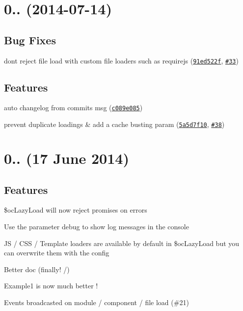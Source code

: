 \label{_0.3.1}%
 \section*{0.. (2014-\/07-\/14)}

\subsection*{Bug Fixes}


\begin{DoxyItemize}
\item don\textquotesingle{}t reject file load with custom file loaders such as requirejs (\href{https://github.com/ocombe/ocLazyLoad/commit/91ed522f724c3d384146053623bbd1e7c2c86751}{\tt 91ed522f}, \href{https://github.com/ocombe/ocLazyLoad/issues/33}{\tt \#33})
\end{DoxyItemize}

\subsection*{Features}


\begin{DoxyItemize}
\item auto changelog from commits msg (\href{https://github.com/ocombe/ocLazyLoad/commit/c089e085431d9f1a968e94c78f3c5ac5af71fa72}{\tt c089e085})
\item prevent duplicate loadings \& add a cache busting param (\href{https://github.com/ocombe/ocLazyLoad/commit/5a5d7f108578fe31c5ca1f7c8dfc2d3bccfd1106}{\tt 5a5d7f10}, \href{https://github.com/ocombe/ocLazyLoad/issues/38}{\tt \#38})
\end{DoxyItemize}

\section*{0.. (17 June 2014)}

\subsection*{Features}


\begin{DoxyItemize}
\item \$oc\+Lazy\+Load will now reject promises on errors
\item Use the parameter {\ttfamily debug} to show log messages in the console
\item JS / C\+SS / Template loaders are available by default in \$oc\+Lazy\+Load but you can overwrite them with the config
\item Better doc (finally! /)
\item Example1 is now much better !
\item Events broadcasted on module / component / file load (\#21)
\end{DoxyItemize}

